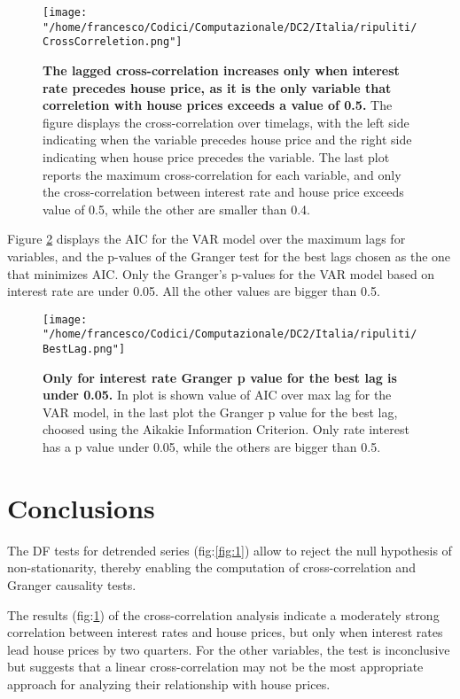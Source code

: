 \documentclass[a4paper,11pt,rmp,superscriptaddress]{report}
\begin{document}
\begin{figure}[h!]
    \texttt{[image: "/home/francesco/Codici/Computazionale/DC2/Italia/ripuliti/CrossCorreletion.png"]}
    \caption[short]{\textbf{The lagged cross-correlation increases only when interest rate precedes house price, as it is the only 
    variable that correletion with house prices exceeds a value of 0.5.} The figure displays the cross-correlation over timelags, with the left side indicating 
    when the variable precedes house price and the right side indicating when house price precedes the variable. 
    The last plot reports the maximum cross-correlation for each variable, and only the cross-correlation between interest rate and 
    house price exceeds value of 0.5, while the other are smaller than 0.4.}
    \label{fig:2}
\end{figure}

Figure \ref*{fig:3} displays the AIC for the VAR model over the maximum lags for variables, and the p-values of the 
Granger test for the best lags chosen as the one that minimizes AIC. Only the Granger's p-values for the VAR model based on 
interest rate are under 0.05. All the other values are bigger than 0.5.

\begin{figure}[h!]
    \texttt{[image: "/home/francesco/Codici/Computazionale/DC2/Italia/ripuliti/BestLag.png"]}
    \caption[short]{\textbf{Only for interest rate Granger p value for the best lag is under 0.05.} In plot is shown value of AIC over 
    max lag for the VAR model, in the last plot the Granger p value for the best lag, choosed using the Aikakie Information Criterion.
    Only rate interest has a p value under 0.05, while the others are bigger than 0.5.}
    \label{fig:3}
\end{figure}

\section*{Conclusions}
The DF tests for detrended series (fig:\ref*{fig:1}) allow to reject the null hypothesis of non-stationarity, 
thereby enabling the computation of cross-correlation and Granger causality tests. 

The results (fig:\ref*{fig:2}) of the cross-correlation analysis indicate a moderately strong correlation between interest rates and house prices, 
but only when interest rates lead house prices by two quarters. For the other variables, the test is inconclusive but suggests 
that a linear cross-correlation may not be the most appropriate approach for analyzing their relationship with house prices.
\end{document}
